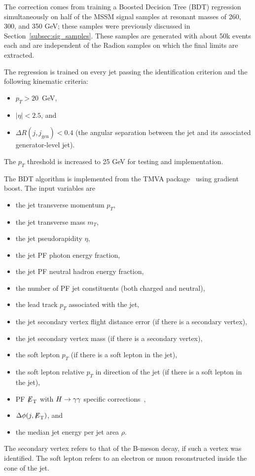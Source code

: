 The correction comes from training a Boosted Decision Tree (BDT) regression simultaneously
on half of the MSSM signal
samples at resonant masses of 260, 300, and 350 GeV; these samples were previously
discussed in Section~\ref{subsec:sig_samples}.
These samples are generated with about 50k events each and are independent of the Radion
samples on which the final limits are extracted.

The regression is trained on every jet passing the identification criterion and the
following kinematic criteria:
\begin{itemize}
\item $p_T > 20$~GeV,
\item $|\eta|<2.5$, and
\item $\Delta R (j, j_\text{gen}) < 0.4$ (the angular separation between the jet and its associated
generator-level jet).
\end{itemize}                                                                                           
The $p_T$ threshold is increased to 25 GeV for testing and implementation.

The BDT algorithm is implemented from the TMVA package~\cite{TMVA2007} using gradient boost.
The input variables are
\begin{itemize}
\item the jet transverse momentum $p_T$,
\item the jet transverse mass $m_T$,
\item the jet pseudorapidity $\eta$,
\item the jet PF photon energy fraction,
\item the jet PF neutral hadron energy fraction,
\item the number of PF jet constituents (both charged and neutral),
\item the lead track $p_T$ associated with the jet,
\item the jet secondary vertex flight distance error (if there is a secondary vertex),
\item the jet secondary vertex mass (if there is a secondary vertex),
\item the soft lepton $p_T$ (if there is a soft lepton in the jet),
\item the soft lepton relative $p_T$ in direction of the jet (if there is a soft lepton in the jet),
\item PF ${\not\mathrel{E}}_{\text{T}}$ with $H\to\gamma\gamma$ specific corrections~\cite{CMS-PAS-HIG-13-001},
\item $\Delta \phi (j, {\not\mathrel{E}}_{\text{T}})$, and
\item the median jet energy per jet area $\rho$. 
\end{itemize}
The secondary vertex refers to that of the B-meson decay, if such a vertex was identified.
The soft lepton refers to an electron or muon resonstructed inside the cone of the jet.

